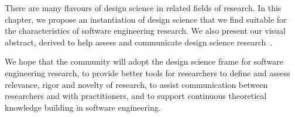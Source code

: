 \documentclass[graybox]{svmult}
\begin{document}
There are many flavours of design science in related fields of research. In this chapter, we propose an instantiation of design science that we find suitable for the characteristics of software engineering research. We also present our visual abstract, derived to help assess and communicate design science research~\cite{StoreyESEM17}. 

We hope that the community will adopt the design science frame for software engineering research, to provide better tools for researchers to define and assess relevance, rigor and novelty of research, to assist communication between researchers and with practitioners, and to support continuous theoretical knowledge building in software engineering. 




\end{document}
